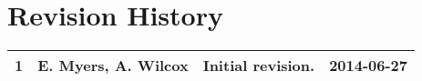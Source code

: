 \section{Revision History}
\sectionrule
\begin{center}
        \begin{tabular*}{0.9\textwidth}{ | l | l | p{7.8cm} | r | }
                \hline
                1 & E. Myers, A. Wilcox & Initial revision. & 2014-06-27 \\
                \hline
        \end{tabular*}
\end{center}